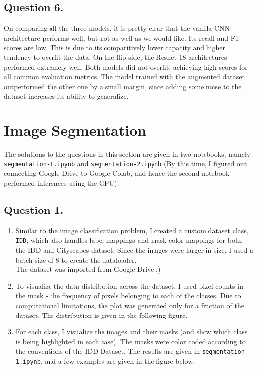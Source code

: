 \documentclass[10pt]{article}
\begin{document}
    \subsection*{\textbf{Question 6.}}
    On comparing all the three models, it is pretty clear that the vanilla CNN architecture
    performs well, but not as well as we would like. Its recall and F1-scores are low. This
    is due to its comparitively lower capacity and higher tendency to overfit the data. On the
    flip side, the Resnet-18 architectures performed extremely well. Both models did not
    overfit, achieving high scores for all common evaluation metrics. The model trained with
    the augmented dataset outperformed the other one by a small margin, since adding some noise
    to the dataset increases its ability to generalize.

    \section*{\textbf{Image Segmentation}}
    The solutions to the questions in this section are given in two notebooks,
    namely \texttt{segmentation-1.ipynb} and \texttt{segmentation-2.ipynb} (By this
    time, I figured out connecting Google Drive to Google Colab, and hence the second
    notebook performed inferences using the GPU).

    \subsection*{\textbf{Question 1.}}
    \begin{enumerate}[label=(\alph*)]
        \item Similar to the image classification problem, I created a custom dataset
        class, \texttt{IDD}, which also handles label mappings and mask color mappings for
        both the IDD and Cityscapes dataset. Since the images were larger in size, I used
        a batch size of 8 to create the dataloader. \\
        The dataset was imported from Google Drive :)
        \item To visualize the data distribution across the dataset, I used pixel counts in
        the mask - the frequency of pixels belonging to each of the classes. Due to computational
        limitations, the plot was generated only for a fraction of the dataset. The distribution
        is given in the following figure.
        \item For each class, I visualize the images and their masks (and show which class
        is being highlighted in each case). The masks were color coded according to the conventions
        of the IDD Dataset. The results are given in \texttt{segmentation-1.ipynb}, and a few
        examples are given in the figure below.
    \end{enumerate}
\end{document}
